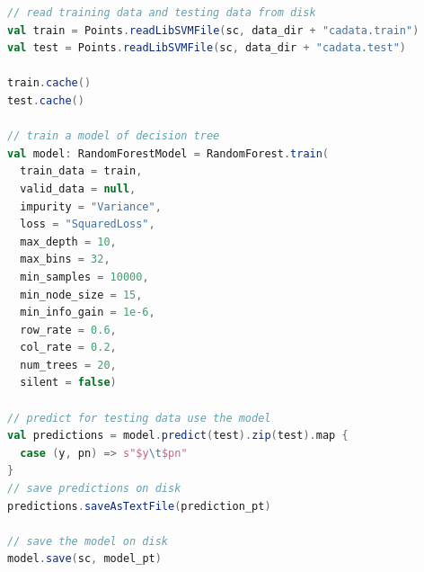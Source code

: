 \documentclass[a4paper,11pt,         %
               ]{article}
\begin{document}
\begin{lstlisting}[language={SCALA},title={RunRandomForestDemo.scala}]  
// read training data and testing data from disk
val train = Points.readLibSVMFile(sc, data_dir + "cadata.train")
val test = Points.readLibSVMFile(sc, data_dir + "cadata.test")

train.cache()
test.cache()

// train a model of decision tree
val model: RandomForestModel = RandomForest.train(
  train_data = train,
  valid_data = null,
  impurity = "Variance",
  loss = "SquaredLoss",
  max_depth = 10,
  max_bins = 32,
  min_samples = 10000,
  min_node_size = 15,
  min_info_gain = 1e-6,
  row_rate = 0.6,
  col_rate = 0.2,
  num_trees = 20,
  silent = false)

// predict for testing data use the model
val predictions = model.predict(test).zip(test).map {
  case (y, pn) => s"$y\t$pn"
}
// save predictions on disk
predictions.saveAsTextFile(prediction_pt)

// save the model on disk
model.save(sc, model_pt)
\end{lstlisting} 


\end{document}
